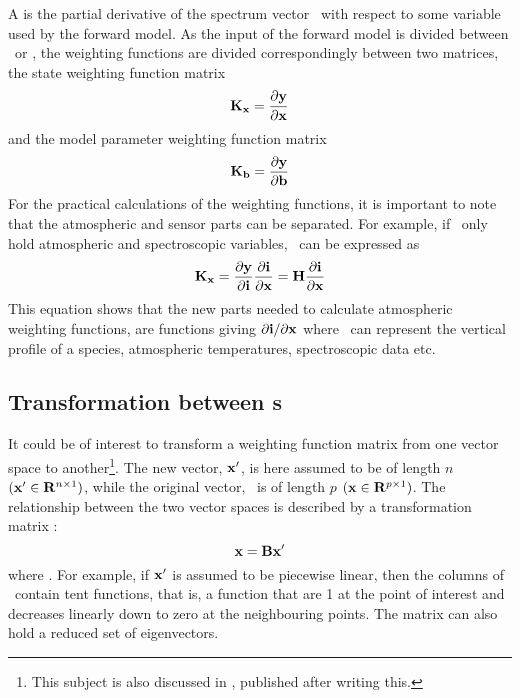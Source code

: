  A  is the partial derivative of the
 spectrum vector \MsrVct\ with respect to some variable used by the
 forward model. As the input of the forward model is divided between
 \SttVct\ or \FrwMdlVct, the weighting functions are divided
 correspondingly between two matrices, the state weighting function
 matrix
 \begin{equation}
   \mathbf{K}_{\mathbf{x}} = \frac{\partial \mathbf{y}}{\partial \mathbf{x}}
  \label{eq:formalism:kx}
 \end{equation}
 and the model parameter weighting function matrix
 \begin{equation}
   \mathbf{K}_{\mathbf{b}} = \frac{\partial \mathbf{y}}{\partial \mathbf{b}}
  \label{eq:formalism:kb}
 \end{equation}
 For the practical calculations of the weighting functions, it is
 important to note that the atmospheric and sensor parts can be
 separated. For example, if \SttVct\ only hold atmospheric and
 spectroscopic variables, \aWfnMtr{\SttVct}\ can be expressed as
 \begin{equation}
   \mathbf{K}_{\mathbf{x}} = \frac{\partial \mathbf{y}}{\partial \mathbf{i}}
                 \frac{\partial \mathbf{i}}{\partial \mathbf{x}} =
         \mathbf{H} \frac{\partial \mathbf{i}}{\partial \mathbf{x}}
  \label{eq:formalism:kx2}
 \end{equation}
 This equation shows that the new parts needed to calculate
 atmospheric weighting functions, are functions giving $\partial\mathbf{i} /
 \partial \mathbf{x}$ where \SttVct\ can represent the vertical profile of a
 species, atmospheric temperatures, spectroscopic data etc.


 \subsection{Transformation between s}
 
 It could be of interest to transform a weighting function matrix from
 one vector space to another\footnote{This subject is also discussed
   in \citet{rodgers:00}, published after writing this.}. The new
 vector, $\mathbf{x}'$, is here assumed to be of length $n$ $(\mathbf{x}' \in
 \mathbf{R}^{n \times 1})$, while the original vector, \SttVct\ is of length $p$
 $(\mathbf{x} \in \mathbf{R}^{p \times 1})$. The relationship between the two vector
 spaces is described by a transformation matrix \VctTrfMtr:
  \begin{equation}
    \mathbf{x} = \mathbf{B} \mathbf{x}'
  \end{equation}
  where \VctTrfMtr \SzeSmb {}. For example, if $\mathbf{x}'$
  is assumed to be piecewise linear, then the columns of \VctTrfMtr\ contain
  tent functions, that is, a function that are 1 at the point of
  interest and decreases linearly down to zero at the neighbouring
  points.  The matrix can also hold a reduced set of eigenvectors.
    
